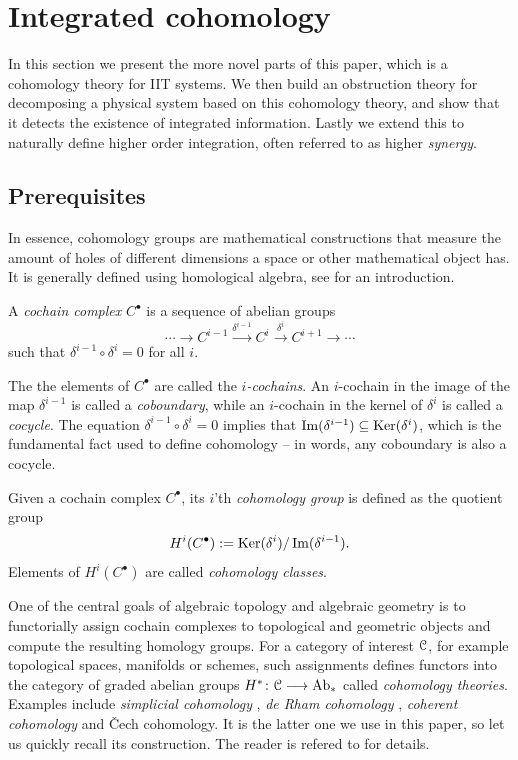 \section{Integrated cohomology}
\label{sec:integrated-cohomology}

In this section we present the more novel parts of this paper, which is a cohomology theory for IIT systems. We then build an obstruction theory for decomposing a physical system based on this cohomology theory, and show that it detects the existence of integrated information. Lastly we extend this to naturally define higher order integration, often referred to as higher \emph{synergy}. 

\subsection{Prerequisites}
In essence, cohomology groups are mathematical constructions that measure the amount of holes of different dimensions a space or other mathematical object has. It is generally defined using homological algebra, see \citeme for an introduction. 

\begin{definition}
    A \emph{cochain complex} $C^\bullet$ is a sequence of abelian groups 
    \[\cdots \to C^{i-1} \overset{\delta^{i-1}}\to C^i \overset{\delta^i}\to C^{i+1} \to \cdots\]
    such that $\delta^{i-1}\circ \delta^i = 0$ for all $i$.
\end{definition}

The the elements of $C^\bullet$ are called the \emph{$i$-cochains}. An $i$-cochain in the image of the map $\delta^{i-1}$ is called a \emph{coboundary}, while an $i$-cochain in the kernel of $\delta^i$ is called a \emph{cocycle}. The equation $\delta^{i-1}\circ \delta^i = 0$ implies that $\operatorname{Im}(\delta^{i-1})\subseteq \operatorname{Ker}(\delta^i)$, which is the fundamental fact used to define cohomology -- in words, any coboundary is also a cocycle. 

\begin{definition}
    Given a cochain complex $C^\bullet$, its $i$'th \emph{cohomology group} is defined as the quotient group
    \[H^i(C^\bullet) := \operatorname{Ker}(\delta^{i})/\operatorname{Im}(\delta^{i-1}).\]
    Elements of $H^i(C^\bullet)$ are called \emph{cohomology classes}. 
\end{definition}

One of the central goals of algebraic topology and algebraic geometry is to functorially assign cochain complexes to topological and geometric objects and compute the resulting homology groups. For a category of interest $\EuScript{C}$, for example topological spaces, manifolds or schemes, such assignments defines functors into the category of graded abelian groups $H^*\colon \EuScript{C} \longrightarrow \mathrm{Ab}_*$ called \emph{cohomology theories}. Examples include \emph{simplicial cohomology} \citeme, \emph{de Rham cohomology} \citeme, \emph{coherent cohomology} \citeme and \v{C}ech cohomology. It is the latter one we use in this paper, so let us quickly recall its construction. The reader is refered to \citeme for details.  

